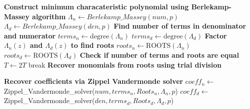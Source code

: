 \begin{algorithm}
\begin{algorithmic}[1]
    \EndFor
     \State \textbf{Construct minimum characateristic polynomial using Berlekamp-Massey algorithm}
    \State $\Lambda_{n} \gets Berlekamp\_Massey(num,p)$
    \State $\Lambda_{d} \gets Berlekamp\_Massey(den,p)$
    \State \textbf{Find number of terms in denominator and numerator}
    \State $terms_{n} \gets \text{degree}(\Lambda_{n})$
    \State $terms_{d} \gets \text{degree}(\Lambda_{d})$ 
    \State \textbf{ Factor $\Lambda_{n}(z)$ and $\Lambda_{d}(z)$  to find roots}
    \State $roots_{n} \gets \text{ROOTS}(\Lambda_{n})$
    \State $roots_{d} \gets \text{ROOTS}(\Lambda_{d})$
    \State \textbf{Check if number of terms and roots are equal}
        \State  $T \gets 2T$ 
        \Else 
        \State break
    \EndIf
    \EndWhile
    \State \textbf{Recover monomials from roots using trial division}
    
    \State \textbf{Recover coefficients via Zippel Vandermonde solver}
    \State $coeff_n \gets$ Zippel\_Vandermonde\_solver($num,terms_{n},Roots_{n},\Lambda_{n},p$)
    \State $coeff_d \gets$  Zippel\_Vandermonde\_solver($den,terms_{d},Roots_{d},\Lambda_{d},p$)


    
    \end{algorithmic}
\end{algorithm}